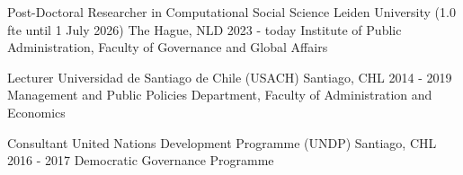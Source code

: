 






\begin{cventries}
\cventry
{Post-Doctoral Researcher in Computational Social Science} 
{Leiden University (1.0 fte until 1 July 2026)} 
{The Hague, NLD} 
{2023 - today}
{Institute of Public Administration, Faculty of Governance and Global Affairs} \vspace{1.5mm}


\cventry
{Lecturer} 
{Universidad de Santiago de Chile (USACH)} 
{Santiago, CHL} 
{2014 - 2019}
{Management and Public Policies Department, Faculty of Administration and Economics} \vspace{1.5mm}


\cventry
{Consultant} 
{United Nations Development Programme (UNDP)} 
{Santiago, CHL} 
{2016 - 2017}
{Democratic Governance Programme} %

\end{cventries}
\pagebreak